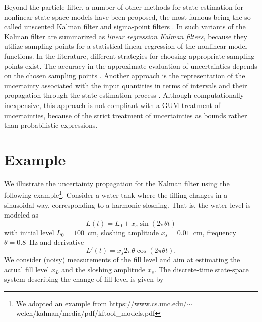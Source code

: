 \documentclass[10pt]{article}
\begin{document}
\begin{spacing}{1}
Beyond the particle filter, a number of other methods for state estimation for nonlinear state-space models have been proposed, the most famous being the so called unscented Kalman filter \cite{Julier:2004go} and sigma-point filters \cite{VanderMerwe:2004tj}. In \cite{Lefebvre:2004jg} such variants of the Kalman filter are summarized as \emph{linear regression Kalman filters}, because they utilize sampling points for a statistical linear regression of the nonlinear model functions. In the literature, different strategies for choosing appropriate sampling points exist. The accuracy in the approximate evaluation of uncertainties depends on the chosen sampling points \cite{Lefebvre:2004jg}.
Another approach is the representation of the uncertainty associated with the input quantities in terms of intervals and their propagation through the state estimation process \cite{Souto:2009bj}. Although computationally inexpensive, this approach is not compliant with a GUM treatment of uncertainties, because of the strict treatment of uncertainties as bounds rather than probabilistic expressions.

\section{Example}
\label{sec:example}
We illustrate the uncertainty propagation for the Kalman filter using the following example\footnote{We adopted an example from https://www.cs.unc.edu/$\sim$welch/kalman/media/pdf/kftool\_models.pdf}. Consider a water tank where the filling changes in a sinusoidal way, corresponding to a harmonic sloshing. That is, the water level is modeled as
\begin{equation}
	L(t) = L_0 + x_s\sin(2\pi\theta t)
\end{equation}
with initial level $L_0=100$~cm, sloshing amplitude $x_s=0.01$~cm, frequency $\theta=0.8$~Hz and derivative
\begin{equation}
	L'(t) = x_s 2\pi\theta \cos(2\pi\theta t) .
\end{equation}
We consider (noisy) measurements of the fill level and aim at estimating the actual fill level $x_L$ and the sloshing amplitude $x_s$. 
The discrete-time state-space system describing the change of fill level is given by


\end{spacing}
\end{document}

